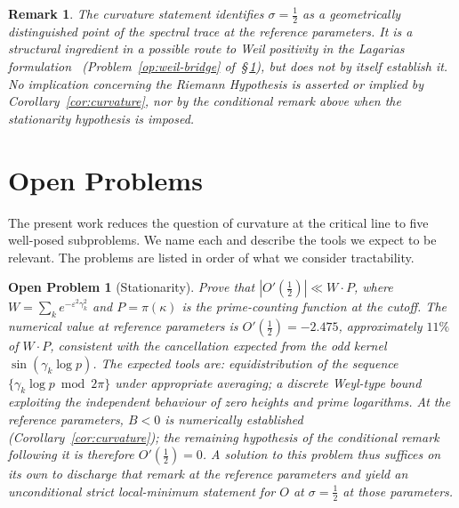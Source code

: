 \documentclass[11pt]{article}
\newtheorem*{remark}{Remark}
\newtheorem{openproblem}[theorem]{Open Problem}
\begin{document}
\begin{remark}
The curvature statement identifies $\sigma=\tfrac12$ as a geometrically
distinguished point of the spectral trace at the reference parameters.
It is a structural ingredient in a possible route to Weil positivity
in the Lagarias formulation~\cite{Lagarias}
(Problem~\ref{op:weil-bridge} of~\S\,\ref{sec:open}), but does not by
itself establish it.
No implication concerning the Riemann Hypothesis is asserted or
implied by Corollary~\ref{cor:curvature}, nor by the conditional remark
above when the stationarity hypothesis is imposed.
\end{remark}

\section{Open Problems}
\label{sec:open}

The present work reduces the question of curvature at the critical
line to five well-posed subproblems.
We name each and describe the tools we expect to be relevant.
The problems are listed in order of what we consider tractability.

\begin{openproblem}[Stationarity]\label{op:stat}
\label{op:stat}
Prove that $|O'(\tfrac12)|\ll W\cdot P$, where
$W=\sum_k e^{-\varepsilon^2\gamma_k^2}$ and $P=\pi(\kappa)$ is the
prime-counting function at the cutoff.
The numerical value at reference parameters is $O'(\tfrac12)=-2.475$,
approximately $11\%$ of $W\cdot P$, consistent with the cancellation
expected from the odd kernel $\sin(\gamma_k\log p)$.
The expected tools are: equidistribution of the sequence
$\{\gamma_k\log p\bmod 2\pi\}$ under appropriate averaging; a discrete
Weyl-type bound exploiting the independent behaviour of zero heights
and prime logarithms.
At the reference parameters, $B<0$ is numerically established
(Corollary~\ref{cor:curvature}); the remaining hypothesis of the
conditional remark following it is therefore $O'(\tfrac12)=0$.
A solution to this problem thus suffices on its own to discharge that
remark at the reference parameters and yield an unconditional strict
local-minimum statement for $O$ at $\sigma=\tfrac12$ at those
parameters.
\end{openproblem}
\end{document}
